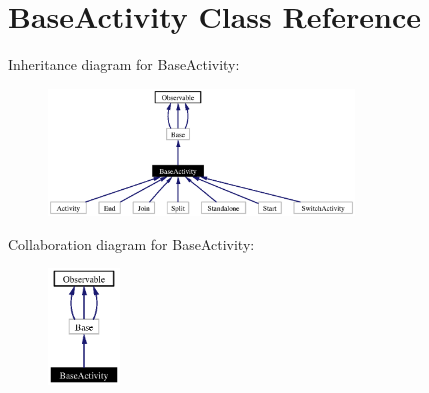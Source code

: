 \section{Base\-Activity Class Reference}
\label{classBaseActivity}
Inheritance diagram for Base\-Activity:\begin{figure}[H]
\begin{center}
\leavevmode
\includegraphics[width=230pt]{classBaseActivity__inherit__graph}
\end{center}
\end{figure}
Collaboration diagram for Base\-Activity:\begin{figure}[H]
\begin{center}
\leavevmode
\includegraphics[width=54pt]{classBaseActivity__coll__graph}
\end{center}
\end{figure}
